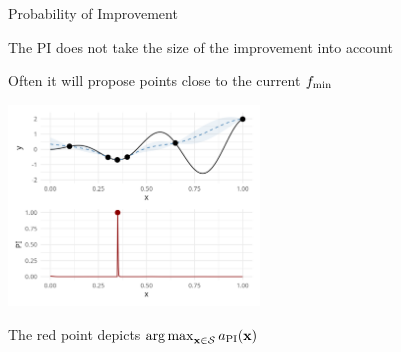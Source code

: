 \documentclass[11pt,compress,t,notes=noshow, xcolor=table]{beamer}
\begin{document}
\begin{vbframe}{Probability of Improvement}
\framebreak

The PI does not take the size of the improvement into account

Often it will propose points close to the current $f_{\min}$

\begin{center}
  \includegraphics[width = 0.5\textwidth]{figure_man/bayesian_loop_pi_1.png}
\end{center}

The red point depicts $\operatorname{arg\,max}_{\mathbf{x} \in \mathcal{S}} a_{\text{PI}}(\mathbf{x})$

\end{vbframe}
\end{document}
